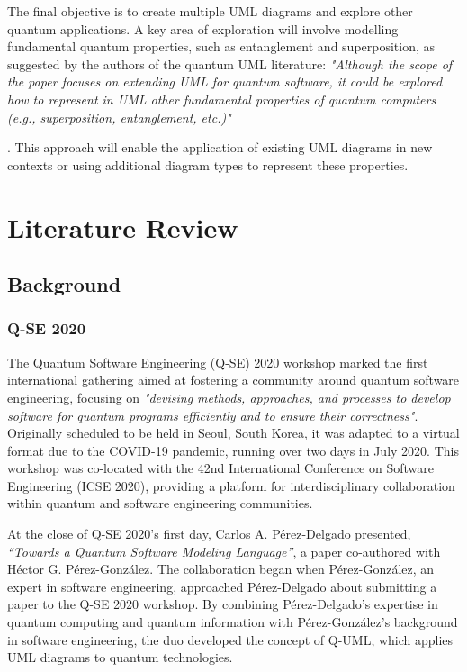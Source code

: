 \documentclass{article}
\begin{document}
The final objective is to create multiple UML diagrams and explore other quantum applications. A key area of exploration will involve modelling fundamental quantum properties, such as entanglement and superposition, as suggested by the authors of the quantum UML literature: \textit{"Although the scope of the paper focuses on extending UML for quantum software, it
could be explored how to represent in UML other fundamental properties of quantum
computers (e.g., superposition, entanglement, etc.)"}{\cite{Pérez-Castillo2022}. This approach will enable the application of existing UML diagrams in new contexts or using additional diagram types to represent these properties.

\section{Literature Review}

\subsection{Background}

\subsubsection{Q-SE 2020}

The Quantum Software Engineering (Q-SE) 2020 workshop marked the first international gathering aimed at fostering a community around quantum software engineering, focusing on \textit{"devising methods, approaches, and processes to develop software for quantum programs efficiently and to ensure their correctness"}\cite{QSE2020}. Originally scheduled to be held in Seoul, South Korea, it was adapted to a virtual format due to the COVID-19 pandemic, running over two days in July 2020. This workshop was co-located with the 42nd International Conference on Software Engineering (ICSE 2020), providing a platform for interdisciplinary collaboration within quantum and software engineering communities.

At the close of Q-SE 2020's first day, Carlos A. Pérez-Delgado presented, \textit{“Towards a Quantum Software Modeling Language”}\cite{Perez-Delgado2020}, a paper co-authored with Héctor G. Pérez-González. The collaboration began when Pérez-González, an expert in software engineering, approached Pérez-Delgado about submitting a paper to the Q-SE 2020 workshop. By combining Pérez-Delgado's expertise in quantum computing and quantum information with Pérez-González's background in software engineering, the duo developed the concept of Q-UML, which applies UML diagrams to quantum technologies\cite{Towards}.

}
\end{document}
